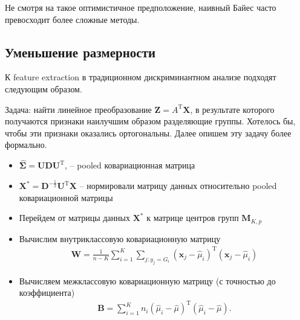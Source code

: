 \documentclass{article}
\begin{document}
Не смотря на такое оптимистичное предположение, наивный Байес часто превосходит более сложные методы.



\subsection{Уменьшение размерности}
К feature extraction в традиционном дискриминантном анализе подходят следующим образом.

Задача: найти линейное преобразование $\mathbf{Z} = A^\mathrm{T}\mathbf{X}$, в результате которого получаются признаки наилучшим образом разделяющие группы.  Хотелось бы, чтобы эти признаки оказались ортогональны. Далее опишем эту задачу более формально.

\begin{itemize}
  \item $\widehat{\mathbf{\Sigma}} = \mathbf{U} \mathbf{D} \mathbf{U}^\mathrm{T}$, -- pooled ковариационная матрица
  \item $\mathbf{X}^\ast = \mathbf{D}^{-\frac{1}{2}}\mathbf{U}^\mathrm{T} \mathbf{X}$ -- нормировали матрицу данных относительно pooled ковариационной матрицы
  \item Перейдем от матрицы данных $\mathbf{X}^\ast$ к матрице центров групп $\mathbf{M}_{K, p}$
  \item Вычислим внутриклассовую ковариационную матрицу
  \begin{align*}
        \mathbf{W} = \frac{1}{n - K} \sum\limits_{i = 1}^K \sum_{j: y_j = G_i} (\mathbf{x}_j - \widehat{\mu}_i)^\mathrm{T}(\mathbf{x}_j - \widehat{\mu}_i)
  \end{align*}
  \item Вычисляем межклассовую ковариационную матрицу (с точностью до коэффициента)
  \begin{align*}
        \mathbf{B} = \sum\limits_{i = 1}^K n_i (\widehat{\mu}_i - \widehat{\mu})^\mathrm{T}(\widehat{\mu}_i - \widehat{\mu}).
  \end{align*}
\end{itemize}
\end{document}
